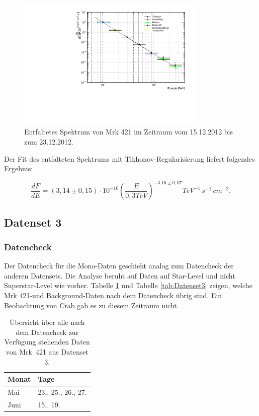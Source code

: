 \begin{figure}
    \centering
    \includegraphics[width=0.8\textwidth]{./Plots/04_MrkAnalyse/Datenset4/Datenset4_Spektrum_Mrk421.pdf}
    \caption{Entfaltetes Spektrum von Mrk 421 im Zeitraum vom 15.12.2012 bis zum 23.12.2012.}
    \label{Datenset4_Spektrum_Mrk421}
\end{figure}

Der Fit des entfalteten Spektrums mit Tikhonov-Regularisierung liefert folgendes Ergebnis:

\begin{equation}
 \frac{dF}{dE}=(3,14 \pm 0,15) \cdot 10^{-10}\left( \frac{E}{0,3 \si{TeV}} \right)^{-3.16\pm 0,07} \si{TeV^{-1}\,s^{-1}\,cm^{-2}}.
\end{equation}


\FloatBarrier

\subsection{Datenset 3}
\label{subsec:Datenset_3}

\subsubsection{Datencheck}
Der Datencheck für die Mono-Daten geschieht analog zum Datencheck der anderen Datensets.
Die Analyse beruht auf Daten auf Star-Level und nicht Superstar-Level wie vorher.
Tabelle \ref{tab:Datenset3-Mrk421} und Tabelle \ref{tab:Datenset3} zeigen, welche Mrk 421-und Background-Daten nach dem Datencheck übrig sind.
Ein Beobachtung von Crab gab es zu diesem Zeitraum nicht.

\begin{table}[!h]
\centering
\caption{Übersicht über alle nach dem Datencheck zur Verfügung stehenden Daten von Mrk~421 aus Datenset 3.}
\label{tab:Datenset3-Mrk421}
\begin{tabular}{ll}
  \toprule
  Monat & Tage\\
  \midrule
  \midrule
Mai & 23., 25., 26., 27.\\
Juni & 15,. 19. \\
  \bottomrule
\end{tabular}
\end{table}


